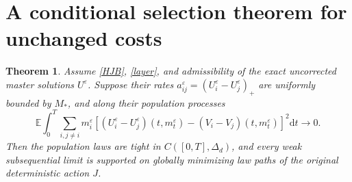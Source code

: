 \documentclass[11pt]{article}
\newtheorem{theorem}{Theorem}
\newcommand{\E}{\mathbb E}
\newcommand{\dd}{\mathrm d}
\begin{document}
\section{A conditional selection theorem for unchanged costs}
\begin{theorem}\label{selection}
Assume \eqref{HJB}, \eqref{layer}, and admissibility of the exact uncorrected master solutions $U^\varepsilon$. Suppose their rates
$a^\varepsilon_{ij}=(U_i^\varepsilon-U_j^\varepsilon)_+$ are uniformly bounded by $M_*$, and along their population processes
\begin{equation}\label{missing}
 \E\int_0^T\sum_{i,j\ne i}m_i^\varepsilon
 \left[(U_i^\varepsilon-U_j^\varepsilon)(t,m_t^\varepsilon)
 -(V_i-V_j)(t,m_t^\varepsilon)\right]^2\dd t\longrightarrow0.
\end{equation}
Then the population laws are tight in $C([0,T],\Delta_d)$, and every weak subsequential limit is supported on globally minimizing law paths of the original deterministic action $J$.
\end{theorem}
\end{document}

